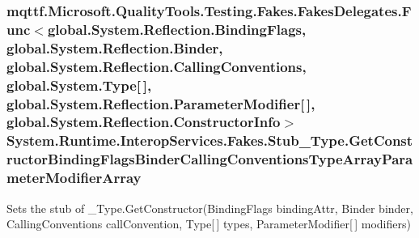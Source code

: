 \hypertarget{class_system_1_1_runtime_1_1_interop_services_1_1_fakes_1_1_stub___type_a9ff35c7ccf961dfda3f6bf565469f58c}{
\subsubsection[{Get\-Constructor\-Binding\-Flags\-Binder\-Calling\-Conventions\-Type\-Array\-Parameter\-Modifier\-Array}]{\setlength{\rightskip}{0pt plus 5cm}mqttf.\-Microsoft.\-Quality\-Tools.\-Testing.\-Fakes.\-Fakes\-Delegates.\-Func$<$global.\-System.\-Reflection.\-Binding\-Flags, global.\-System.\-Reflection.\-Binder, global.\-System.\-Reflection.\-Calling\-Conventions, global.\-System.\-Type\mbox{[}$\,$\mbox{]}, global.\-System.\-Reflection.\-Parameter\-Modifier\mbox{[}$\,$\mbox{]}, global.\-System.\-Reflection.\-Constructor\-Info$>$ System.\-Runtime.\-Interop\-Services.\-Fakes.\-Stub\-\_\-\-Type.\-Get\-Constructor\-Binding\-Flags\-Binder\-Calling\-Conventions\-Type\-Array\-Parameter\-Modifier\-Array}}\label{class_system_1_1_runtime_1_1_interop_services_1_1_fakes_1_1_stub___type_a9ff35c7ccf961dfda3f6bf565469f58c}


Sets the stub of \-\_\-\-Type.\-Get\-Constructor(\-Binding\-Flags binding\-Attr, Binder binder, Calling\-Conventions call\-Convention, Type\mbox{[}$\,$\mbox{]} types, Parameter\-Modifier\mbox{[}$\,$\mbox{]} modifiers)

